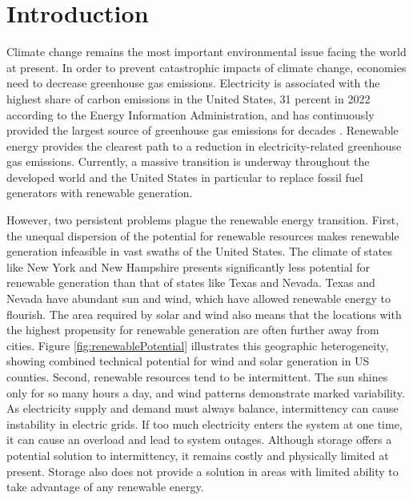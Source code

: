 \documentclass[12pt]{article}
\begin{document}
\begin{titlepage}
\begin{abstract}
\bigskip
\end{abstract}
\setcounter{page}{0}
\thispagestyle{empty}
\end{titlepage}
\pagebreak \newpage




\doublespacing


\section{Introduction} \label{sec:introduction}

Climate change remains the most important environmental issue facing the world at present. In order to prevent catastrophic impacts of climate change, economies need to decrease greenhouse gas emissions. Electricity is associated with the highest share of carbon emissions in the United States, 31 percent in 2022 according to the Energy Information Administration, and has continuously provided the largest source of greenhouse gas emissions for decades \autocite{EIAReport}. Renewable energy provides the clearest path to a reduction in electricity-related greenhouse gas emissions. Currently, a massive transition is underway throughout the developed world and the United States in particular to replace fossil fuel generators with renewable generation.

However, two persistent problems plague the renewable energy transition. First, the unequal dispersion of the potential for renewable resources makes renewable generation infeasible in vast swaths of the United States. The climate of states like New York and New Hampshire presents significantly less potential for renewable generation than that of states like Texas and Nevada. Texas and Nevada have abundant sun and wind, which have allowed renewable energy to flourish. The area required by solar and wind also means that the locations with the highest propensity for renewable generation are often further away from cities. Figure \ref{fig:renewablePotential} illustrates this geographic heterogeneity, showing combined technical potential for wind and solar generation in US counties. Second, renewable resources tend to be intermittent. The sun shines only for so many hours a day, and wind patterns demonstrate marked variability. As electricity supply and demand must always balance, intermittency can cause instability in electric grids. If too much electricity enters the system at one time, it can cause an overload and lead to system outages. Although storage offers a potential solution to intermittency, it remains costly and physically limited at present. Storage also does not provide a solution in areas with limited ability to take advantage of any renewable energy.
\end{document}
